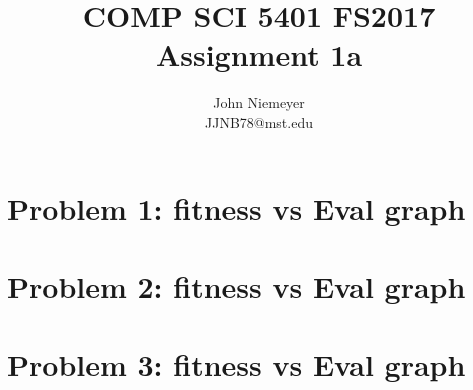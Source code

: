 \documentclass[•]{article}
\author{John Niemeyer\\JJNB78@mst.edu}
\title{COMP SCI 5401 FS2017 Assignment 1a}
\begin{document}
\maketitle
\lstset{language=python}

\section*{Problem 1: fitness vs Eval graph}

\section*{Problem 2: fitness vs Eval graph}

\section*{Problem 3: fitness vs Eval graph}
\end{document}
